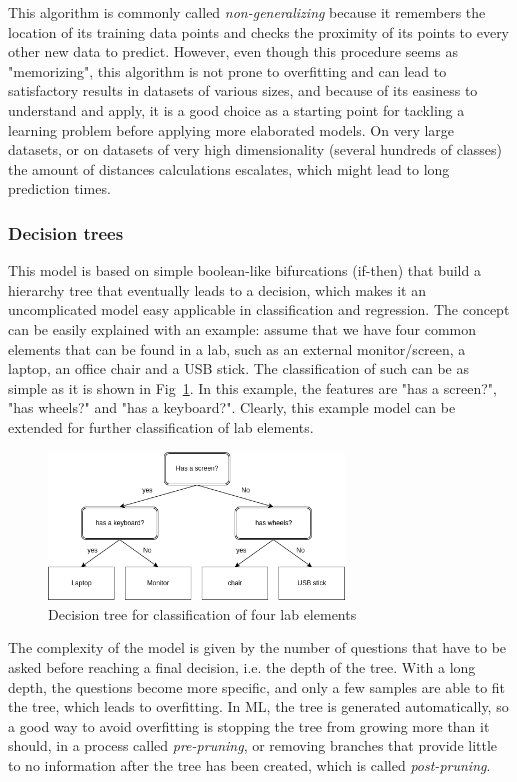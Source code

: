 This algorithm is commonly called \emph{non-generalizing} because it remembers the location of its training data points and checks the proximity of its points to every other new data to predict. However, even though this procedure seems as "memorizing", this algorithm is not prone to overfitting and can lead to satisfactory results in datasets of various sizes, and because of its easiness to understand and apply, it is a good choice as a starting point for tackling a learning problem before applying more elaborated models. On very large datasets, or on datasets of very high dimensionality (several hundreds of classes) the amount of distances calculations escalates, which might lead to long prediction times.

\subsubsection{Decision trees}
This model is based on simple boolean-like bifurcations (if-then) that build a hierarchy tree that eventually leads to a decision, which makes it an uncomplicated model easy applicable in classification and regression. The concept can be easily explained with an example: assume that we have four common elements that can be found in a lab, such as an external monitor/screen, a laptop, an office chair and a USB stick. The classification of such can be as simple as it is shown in Fig~\ref{fig:dt_example}. In this example, the features are "has a screen?", "has wheels?" and "has a keyboard?". Clearly, this example model can be extended for further classification of lab elements.

\begin{figure}[!htb]
    \centering
      \includegraphics[width=0.7\textwidth]{figures/dt_example}
      \caption{Decision tree for classification of four lab elements}
      \label{fig:dt_example}
\end{figure}

The complexity of the model is given by the number of questions that have to be asked before reaching a final decision, i.e. the depth of the tree. With a long depth, the questions become more specific, and only a few samples are able to fit the tree, which leads to overfitting. In \ac{ML}, the tree is generated automatically, so a good way to avoid overfitting is stopping the tree from growing more than it should, in a process called \emph{pre-pruning}, or removing branches that provide little to no information after the tree has been created, which is called \emph{post-pruning}.


